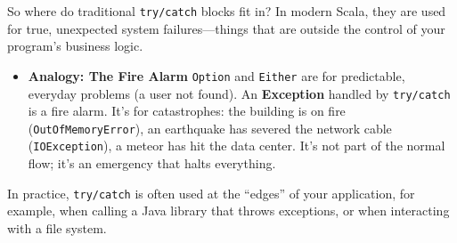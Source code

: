 \documentclass[
  letterpaper,
  DIV=11,
  numbers=noendperiod]{scrreprt}
\newenvironment{Shaded}{\begin{snugshade}}{\end{snugshade}}
\newcommand{\CharTok}[1]{\textcolor[rgb]{0.13,0.47,0.30}{#1}}
\newcommand{\ControlFlowTok}[1]{\textcolor[rgb]{0.00,0.23,0.31}{\textbf{#1}}}
\newcommand{\ExtensionTok}[1]{\textcolor[rgb]{0.00,0.23,0.31}{#1}}
\newcommand{\FunctionTok}[1]{\textcolor[rgb]{0.28,0.35,0.67}{#1}}
\newcommand{\KeywordTok}[1]{\textcolor[rgb]{0.00,0.23,0.31}{\textbf{#1}}}
\newcommand{\NormalTok}[1]{\textcolor[rgb]{0.00,0.23,0.31}{#1}}
\newcommand{\OperatorTok}[1]{\textcolor[rgb]{0.37,0.37,0.37}{#1}}
\newcommand{\SpecialStringTok}[1]{\textcolor[rgb]{0.13,0.47,0.30}{#1}}
\newcommand{\StringTok}[1]{\textcolor[rgb]{0.13,0.47,0.30}{#1}}
\providecommand{\tightlist}{%
  \setlength{\itemsep}{0pt}\setlength{\parskip}{0pt}}
\begin{document}
So where do traditional \texttt{try/catch} blocks fit in? In modern
Scala, they are used for true, unexpected system failures---things that
are outside the control of your program's business logic.

\begin{itemize}
\tightlist
\item
  \textbf{Analogy: The Fire Alarm} \texttt{Option} and \texttt{Either}
  are for predictable, everyday problems (a user not found). An
  \textbf{Exception} handled by \texttt{try/catch} is a fire alarm. It's
  for catastrophes: the building is on fire (\texttt{OutOfMemoryError}),
  an earthquake has severed the network cable (\texttt{IOException}), a
  meteor has hit the data center. It's not part of the normal flow; it's
  an emergency that halts everything.
\end{itemize}

In practice, \texttt{try/catch} is often used at the ``edges'' of your
application, for example, when calling a Java library that throws
exceptions, or when interacting with a file system.

\begin{Shaded}
\end{Shaded}
\end{document}
